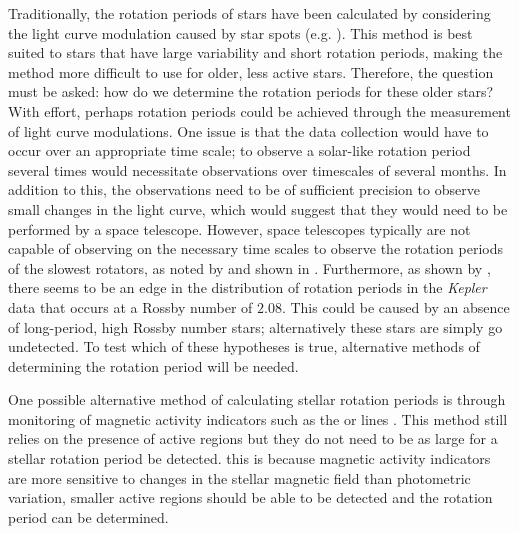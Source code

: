 Traditionally, the rotation periods of stars have been calculated by considering the light curve modulation caused by star spots (e.g. \citealt{McQuillan_etal_2014}). This method is best suited to stars that have large variability and short rotation periods, making the method more difficult to use for older, less active stars. Therefore, the question must be asked: how do we determine the rotation periods for these older stars? With effort, perhaps rotation periods could be achieved through the measurement of light curve modulations. One issue is that the data collection would have to occur over an appropriate time scale; to observe a solar-like rotation period several times would necessitate observations over timescales of several months. In addition to this, the observations need to be of sufficient precision to observe small changes in the light curve, which would suggest that they would need to be performed by a space telescope. However, space telescopes typically are not capable of observing on the necessary time scales to observe the rotation periods of the slowest rotators, as noted by \citet{Barnes_etal_2016} and shown in \citet{Esselstein_etal_2018}. Furthermore, as shown by \citet{van_Saders_etal_2019}, there seems to be an edge in the distribution of rotation periods in the \textit{Kepler} data that occurs at a Rossby number of $2.08$. This could be caused by an absence of long-period, high Rossby number stars; alternatively these stars are simply go undetected. To test which of these hypotheses is true, alternative methods of determining the rotation period will be needed.

One possible alternative method of calculating stellar rotation periods is through monitoring of magnetic activity indicators such as the \caII or \Halpha lines \citep{Boro_Saikia_etal_2016,Robertson_etal_2015_GJ176}. This method still relies on the presence of active regions but they do not need to be as large for a stellar rotation period be detected. this is because magnetic activity indicators are more sensitive to changes in the stellar magnetic field than photometric variation, smaller active regions should be able to be detected and the rotation period can be determined. 

